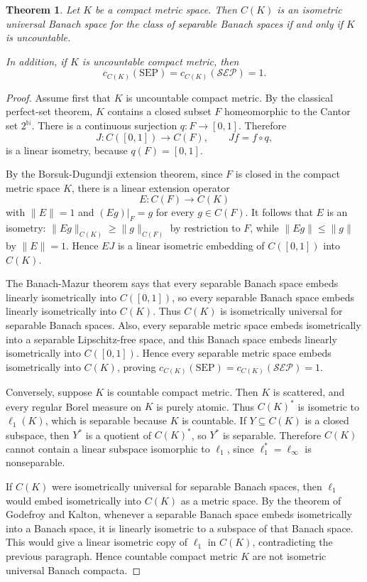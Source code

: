 \documentclass[11pt]{article}
\newtheorem{theorem}{Theorem}
\begin{document}
\begin{theorem}
Let \(K\) be a compact metric space.  Then \(C(K)\) is an isometric universal Banach space for the class of separable Banach spaces if and only if \(K\) is uncountable.

In addition, if \(K\) is uncountable compact metric, then
\[
c_{C(K)}(\mathrm{SEP})=c_{C(K)}(\mathcal{SEP})=1.
\]
\end{theorem}

\begin{proof}
Assume first that \(K\) is uncountable compact metric.  By the classical perfect-set theorem, \(K\) contains a closed subset \(F\) homeomorphic to the Cantor set \(2^{\mathbb N}\).  There is a continuous surjection \(q:F\to[0,1]\).  Therefore
\[
J:C([0,1])\to C(F),\qquad Jf=f\circ q,
\]
is a linear isometry, because \(q(F)=[0,1]\).

By the Borsuk-Dugundji extension theorem, since \(F\) is closed in the compact metric space \(K\), there is a linear extension operator
\[
E:C(F)\to C(K)
\]
with \(\|E\|=1\) and \((Eg)|_F=g\) for every \(g\in C(F)\).  It follows that \(E\) is an isometry: \(\|Eg\|_{C(K)}\ge \|g\|_{C(F)}\) by restriction to \(F\), while \(\|Eg\|\le\|g\|\) by \(\|E\|=1\).  Hence \(EJ\) is a linear isometric embedding of \(C([0,1])\) into \(C(K)\).

The Banach-Mazur theorem says that every separable Banach space embeds linearly isometrically into \(C([0,1])\), so every separable Banach space embeds linearly isometrically into \(C(K)\).  Thus \(C(K)\) is isometrically universal for separable Banach spaces.  Also, every separable metric space embeds isometrically into a separable Lipschitz-free space, and this Banach space embeds linearly isometrically into \(C([0,1])\).  Hence every separable metric space embeds isometrically into \(C(K)\), proving \(c_{C(K)}(\mathrm{SEP})=c_{C(K)}(\mathcal{SEP})=1\).

Conversely, suppose \(K\) is countable compact metric.  Then \(K\) is scattered, and every regular Borel measure on \(K\) is purely atomic.  Thus \(C(K)^*\) is isometric to \(\ell_1(K)\), which is separable because \(K\) is countable.  If \(Y\subseteq C(K)\) is a closed subspace, then \(Y^*\) is a quotient of \(C(K)^*\), so \(Y^*\) is separable.  Therefore \(C(K)\) cannot contain a linear subspace isomorphic to \(\ell_1\), since \(\ell_1^*=\ell_\infty\) is nonseparable.

If \(C(K)\) were isometrically universal for separable Banach spaces, then \(\ell_1\) would embed isometrically into \(C(K)\) as a metric space.  By the theorem of Godefroy and Kalton, whenever a separable Banach space embeds isometrically into a Banach space, it is linearly isometric to a subspace of that Banach space.  This would give a linear isometric copy of \(\ell_1\) in \(C(K)\), contradicting the previous paragraph.  Hence countable compact metric \(K\) are not isometric universal Banach compacta.
\end{proof}
\end{document}
